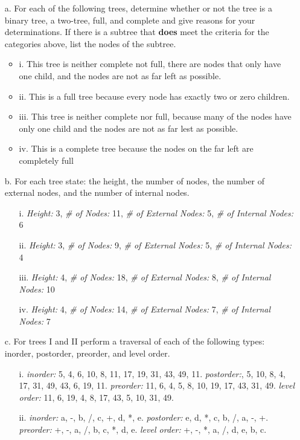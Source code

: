 \documentclass[11pt]{article}
\begin{document}
\begin{enumerate}
    \item[a.] For each of the following trees, determine whether or not the tree is a binary tree, a two-tree, full, and complete and give reasons for your determinations. If there is a subtree that \textbf{does} meet the criteria for the categories above, list the nodes of the subtree.
    \begin{itemize}
        \item i.  This tree is neither complete not full, there are nodes that only have one child, and the nodes are not as far left as possible.
        \item ii. This is a full tree because every node has exactly two or zero children.
        \item iii. This tree is neither complete nor full, because many of the nodes have only one child and the nodes are not as far lest as possible.
        \item iv. This is a complete tree because the nodes on the far left are completely full 
    \end{itemize}
    \item[b.] For each tree state: the height, the number of nodes, the number of external nodes, and the number of internal nodes. 
    \begin{enumerate}
        \item[i. ] \textit{Height:} 3, \textit{\# of Nodes:} 11, \textit{\# of External Nodes:} 5, \textit{\# of Internal Nodes:} 6 
        \item[ii. ] \textit{Height:} 3, \textit{\# of Nodes:} 9, \textit{\# of External Nodes:} 5, \textit{\# of Internal Nodes:} 4
        \item[iii. ] \textit{Height:} 4, \textit{\# of Nodes:} 18, \textit{\# of External Nodes:} 8, \textit{\# of Internal Nodes:} 10
        \item[iv. ] \textit{Height:} 4, \textit{\# of Nodes:} 14, \textit{\# of External Nodes:} 7, \textit{\# of Internal Nodes:} 7
    \end{enumerate}
     
    \item[c.] For trees I and II perform a traversal of each of the following types: inorder, postorder, preorder, and level order.
    \begin{enumerate}
        \item[i. ] \textit{inorder:} 5, 4, 6, 10, 8, 11, 17, 19, 31, 43, 49, 11. \textit{postorder:}, 5, 10, 8, 4, 17, 31, 49, 43, 6, 19, 11. \textit{preorder:} 11, 6, 4, 5, 8, 10, 19, 17, 43, 31, 49. \textit{level order:} 11, 6, 19, 4, 8, 17, 43, 5, 10, 31, 49.
        
        \item[ii. ] \textit{inorder:} a, -, b, /, c, +, d, *, e. \textit{postorder:} e, d, *, c, b, /, a, -, +. \textit{preorder:} +, -, a, /, b, c, *, d, e.  \textit{level order:} +, -, *, a, /, d, e, b, c.
    \end{enumerate}
    
    
    
\end{enumerate}
\end{document}
